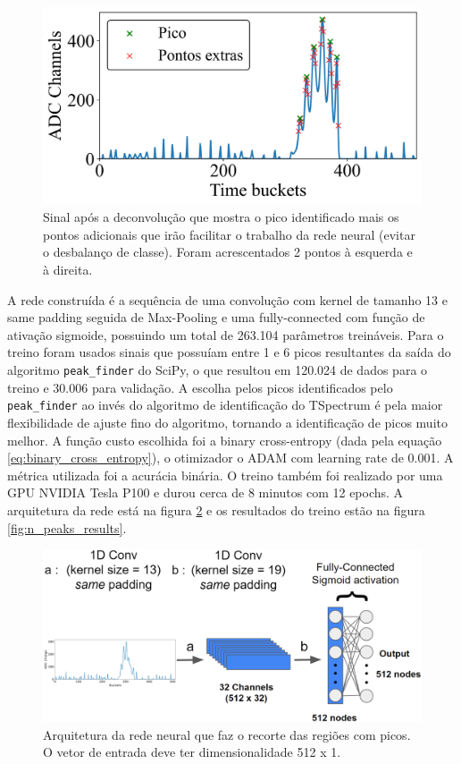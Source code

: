 \documentclass[a4paper,12pt,oneside]{book}
\begin{document}
\begin{figure}[H]
    \centering
    \includegraphics[scale = 0.6]{figs/np_ex1.png}
    \caption{Sinal após a deconvolução que mostra o pico identificado mais os pontos adicionais que irão facilitar o trabalho da rede neural (evitar o desbalanço de classe). Foram acrescentados 2 pontos à esquerda e à direita.}
    \label{fig:n_peaks_exs}
\end{figure}

\par A rede construída é a sequência de uma convolução com kernel de tamanho 13 e same padding seguida de Max-Pooling e uma fully-connected com função de ativação sigmoide, possuindo um total de 263.104 parâmetros treináveis. Para o treino foram usados sinais que possuíam entre 1 e 6 picos resultantes da saída do algoritmo \texttt{peak\_finder} do SciPy, o que resultou em 120.024 de dados para o treino e 30.006 para validação. A escolha pelos picos identificados pelo \texttt{peak\_finder} ao invés do algoritmo de identificação do TSpectrum é pela maior flexibilidade de ajuste fino do algoritmo, tornando a identificação de picos muito melhor\cite{FORTINO2022166497}. A função custo escolhida foi a binary cross-entropy (dada pela equação \ref{eq:binary_cross_entropy}), o otimizador o ADAM com learning rate de 0.001. A métrica utilizada foi a acurácia binária. O treino também foi realizado por uma GPU NVIDIA Tesla P100 e durou cerca de 8 minutos com 12 epochs. A arquitetura da rede está na figura \ref{fig:arq:n_peaks} e os resultados do treino estão na figura \ref{fig:n_peaks_results}.

\begin{figure}[H]
    \centering
    \includegraphics[scale = 0.35]{figs/n_peaks.png}
    \caption{Arquitetura da rede neural que faz o recorte das regiões com picos. O vetor de entrada deve ter dimensionalidade 512 x 1.}
    \label{fig:arq:n_peaks}
\end{figure}
\end{document}
